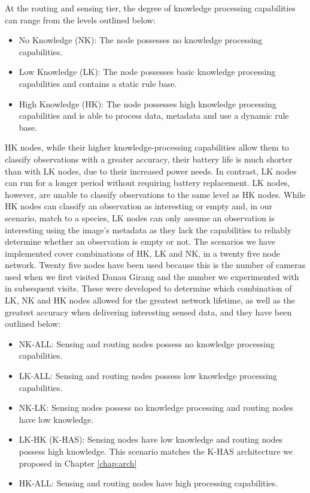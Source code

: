 	At the routing and sensing tier, the degree of knowledge processing capabilities can range from the levels outlined below:
	
	\begin{itemize}
		\item No Knowledge (NK): The node possesses no knowledge processing capabilities.
		\item Low Knowledge (LK): The node possesses basic knowledge processing capabilities and contains a static rule base.
		\item High Knowledge (HK): The node possesses high knowledge processing capabilities and is able to process data, metadata and use a dynamic rule base.
	\end{itemize}
	
	HK nodes, while their higher knowledge-processing capabilities allow them to classify observations with a greater accuracy, their battery life is much shorter than with LK nodes, due to their increased power needs. In contrast, LK nodes can run for a longer period without requiring battery replacement. LK nodes, however, are unable to classify observations to the same level as HK nodes. While HK nodes can classify an observation as interesting or empty and, in our scenario, match to a species, LK nodes can only assume an observation is interesting using the image's metadata as they lack the capabilities to reliably determine whether an observation is empty or not. The scenarios we have implemented cover combinations of HK, LK and NK, in a twenty five node network. Twenty five nodes have been used because this is the number of cameras used when we first visited Danau Girang and the number we experimented with in subsequent visits. These were developed to determine which combination of LK, NK and HK nodes allowed for the greatest network lifetime, as well as the greatest accuracy when delivering interesting sensed data, and they have been outlined below:
	
	\begin{itemize}
		\item NK-ALL: Sensing and routing nodes possess no knowledge processing capabilities.
		\item LK-ALL: Sensing and routing nodes possess low knowledge processing capabilities.
		\item NK-LK: Sensing nodes possess no knowledge processing and routing nodes have low knowledge.
		\item LK-HK (K-HAS): Sensing nodes have low knowledge and routing nodes possess high knowledge. This scenario matches the K-HAS architecture we proposed in Chapter \ref{chap:arch}
		\item HK-ALL: Sensing and routing nodes have high processing capabilities.
	\end{itemize}

